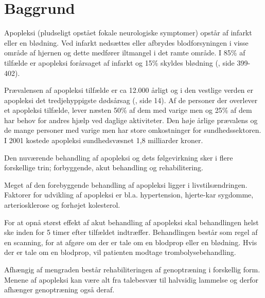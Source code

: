 \chapter{Baggrund} \label{chap:Baggrund}

Apopleksi (pludseligt opstået fokale neurologiske symptomer) opstår af infarkt eller en blødning. Ved infarkt nedsættes eller afbrydes blodforsyningen i visse område af hjernen og dette medfører iltmangel i det ramte område. I 85\% af tilfælde er apopleksi forårsaget af infarkt og 15\% skyldes blødning (\cite{RefWorks:32}, side 399-402).

Prævalensen af apopleksi tilfælde er ca 12.000 årligt og i den vestlige verden er apopleksi det tredjehyppigste dødsårsag (\cite{RefWorks:21}, side 14). Af de personer der overlever et apopleksi tilfælde, lever næsten 50\% af dem med varige men og 25\% af dem har behov for andres hjælp ved daglige aktiviteter.  Den høje årlige prævalens og de mange personer med varige men har store omkostninger for sundhedssektoren.  I 2001 kostede apopleksi sundhedsvæsnet 1,8 milliarder kroner. 

Den nuværende behandling af apopleksi og dets følgevirkning sker i flere forskellige trin; forbyggende, akut behandling og rehabilitering. 

Meget af den forebyggende behandling af apopleksi ligger i livstilsændringen. Faktorer for udvikling af apopleksi er bl.a. hypertension, hjerte-kar sygdomme, arteriosklerose og forhøjet kolesterol. 

For at opnå størst effekt af akut behandling af apopleksi skal behandlingen helst ske inden for 5 timer efter tilfældet indtræffer. Behandlingen består som regel af en scanning, for at afgøre om der er tale om en blodprop eller en blødning. Hvis der er tale om en blodprop, vil patienten modtage trombolysebehandling.

Afhængig af mengraden består rehabiliteringen af genoptræning i forskellig form. Menene af apopleksi kan være alt fra talebesvær til halvsidig lammelse og derfor afhænger genoptræning også deraf. 

